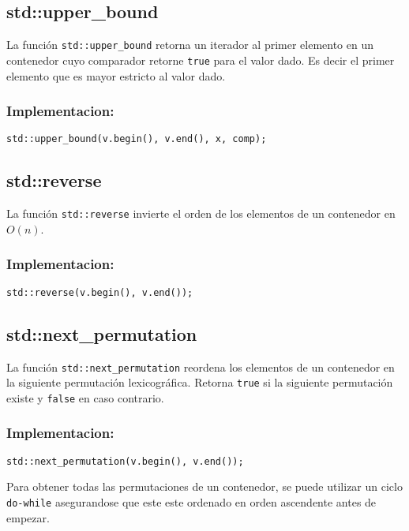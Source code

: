 \subsection{std::upper\_bound}
\label{subsec:std_upper_bound}
La función \texttt{std::upper\_bound} retorna un iterador al primer elemento en un contenedor cuyo comparador retorne \texttt{true} para el valor dado. Es decir el primer elemento que es mayor estricto al valor dado.

\subsubsection*{Implementacion:}
\begin{lstlisting}
std::upper_bound(v.begin(), v.end(), x, comp);
\end{lstlisting}



\subsection{std::reverse}
\label{subsec:std_reverse}
La función \texttt{std::reverse} invierte el orden de los elementos de un contenedor en $O(n)$. 

\subsubsection*{Implementacion:}
\begin{lstlisting}
std::reverse(v.begin(), v.end());
\end{lstlisting}

\subsection{std::next\_permutation}
\label{subsec:std_next_permutation}
La función \texttt{std::next\_permutation} reordena los elementos de un contenedor en la siguiente permutación lexicográfica. Retorna \texttt{true} si la siguiente permutación existe y \texttt{false} en caso contrario. 


\subsubsection*{Implementacion:}
\begin{lstlisting}
std::next_permutation(v.begin(), v.end());
\end{lstlisting}


Para obtener todas las permutaciones de un contenedor, se puede utilizar un ciclo \texttt{do-while} asegurandose que este este ordenado en orden ascendente antes de empezar. 

